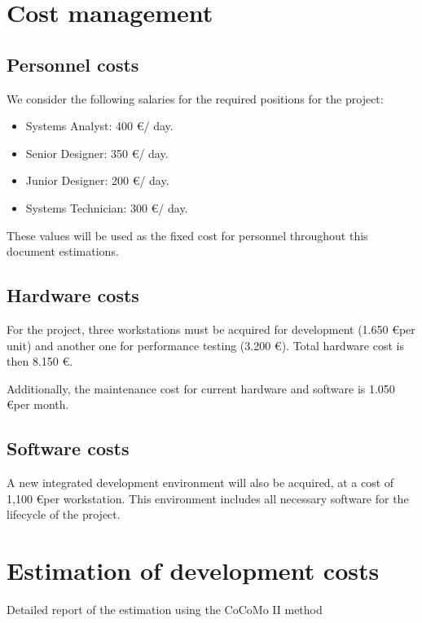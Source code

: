 \section{Cost management}

\subsection{Personnel costs}

We consider the following salaries for the required positions for the project:

\begin{itemize}
\item Systems Analyst: 400 \euro / day.
\item Senior Designer: 350 \euro / day.
\item Junior Designer: 200 \euro / day.
\item Systems Technician: 300 \euro / day.
\end{itemize}

These values will be used as the fixed cost for personnel throughout this document estimations.

\subsection{Hardware costs}

For the project, three workstations must be acquired for development (1.650 \euro per unit) and another one for performance testing (3.200 \euro). Total hardware cost is then 8.150 \euro.

Additionally, the maintenance cost for current hardware and software is 1.050 \euro per month.

\subsection{Software costs}

A new integrated development environment will also be acquired, at a cost of 1,100 \euro per workstation. This environment includes all necessary software for the lifecycle of the project.

\section{Estimation of development costs}

\begin{table}[hbtp]
\centering

\caption{Detailed report of the estimation using the CoCoMo II method}
\label{tblCocomoDetail}
\end{table}
